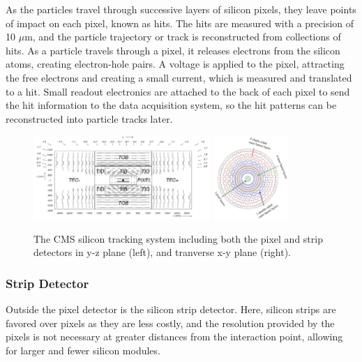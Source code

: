 As the particles travel through successive layers of silicon pixels, they leave points of impact on each pixel, known as hits.
The hits are measured with a precision of 10 $\mu$m, and the particle trajectory or track is reconstructed from collections of hits. 
As a particle travels through a pixel, it releases electrons from the silicon atoms, creating electron-hole pairs.
A voltage is applied to the pixel, attracting the free electrons and creating a small current, which is measured and translated to a hit. Small readout electronics
are attached to the back of each pixel to send the hit information to the data acquisition system, so the hit patterns can be reconstructed into particle tracks later.   

\begin{figure}[hbtp]
 \begin{center}
   \includegraphics[width=0.6\textwidth]{tracker_yz.pdf}
   \includegraphics[width=0.25\textwidth]{tracker_transverse_layers.pdf}
   \caption[text in square brackets]{The CMS silicon tracking system including both the pixel and strip detectors in y-z plane (left), and tranverse x-y plane (right).}
   \label{fig:cms_tracker}
 \end{center}
\end{figure}

\subsubsection{Strip Detector}
Outside the pixel detector is the silicon strip detector. Here, silicon strips are favored over pixels as they are less costly, and the resolution provided by the pixels
is not necessary at greater distances from the interaction point, allowing for larger and fewer silicon modules. 


